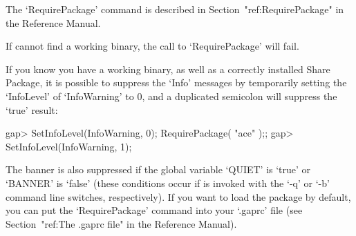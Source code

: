 The      `RequirePackage'      command      is      described       in
Section~"ref:RequirePackage" in the {\GAP} Reference Manual.

If {\GAP} cannot find a working binary, the call  to  `RequirePackage'
will fail.

If you know you have a working {\ACE} binary, as well as  a  correctly
installed {\ACE} Share Package, it is possible to suppress the  `Info'
messages by temporarily setting the `InfoLevel' of `InfoWarning' to 0,
and a duplicated semicolon will suppress the `true' result:

\beginexample
gap> SetInfoLevel(InfoWarning, 0); RequirePackage( "ace" );;
gap> SetInfoLevel(InfoWarning, 1);
\endexample

The banner is also suppressed if the global {\GAP} variable `QUIET' is
`true' or `BANNER' is `false' (these conditions  occur  if  {\GAP}  is
invoked with the `-q' or `-b' command line switches, respectively). If
you want to load the {\ACE}  package  by  default,  you  can  put  the
`RequirePackage' command into your `.gaprc' file (see Section~"ref:The
.gaprc file" in the {\GAP} Reference Manual).

